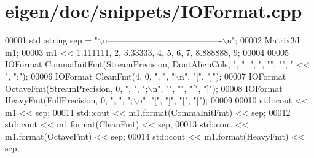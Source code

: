 \hypertarget{eigen_2doc_2snippets_2_i_o_format_8cpp_source}{}\section{eigen/doc/snippets/\+I\+O\+Format.cpp}
\label{eigen_2doc_2snippets_2_i_o_format_8cpp_source}

\begin{DoxyCode}
00001 std::string sep = \textcolor{stringliteral}{"\(\backslash\)n----------------------------------------\(\backslash\)n"};
00002 Matrix3d m1;
00003 m1 << 1.111111, 2, 3.33333, 4, 5, 6, 7, 8.888888, 9;
00004 
00005 IOFormat CommaInitFmt(StreamPrecision, DontAlignCols, \textcolor{stringliteral}{", "}, \textcolor{stringliteral}{", "}, \textcolor{stringliteral}{""}, \textcolor{stringliteral}{""}, \textcolor{stringliteral}{" << "}, \textcolor{stringliteral}{";"});
00006 IOFormat CleanFmt(4, 0, \textcolor{stringliteral}{", "}, \textcolor{stringliteral}{"\(\backslash\)n"}, \textcolor{stringliteral}{"["}, \textcolor{stringliteral}{"]"});
00007 IOFormat OctaveFmt(StreamPrecision, 0, \textcolor{stringliteral}{", "}, \textcolor{stringliteral}{";\(\backslash\)n"}, \textcolor{stringliteral}{""}, \textcolor{stringliteral}{""}, \textcolor{stringliteral}{"["}, \textcolor{stringliteral}{"]"});
00008 IOFormat HeavyFmt(FullPrecision, 0, \textcolor{stringliteral}{", "}, \textcolor{stringliteral}{";\(\backslash\)n"}, \textcolor{stringliteral}{"["}, \textcolor{stringliteral}{"]"}, \textcolor{stringliteral}{"["}, \textcolor{stringliteral}{"]"});
00009 
00010 std::cout << m1 << sep;
00011 std::cout << m1.format(CommaInitFmt) << sep;
00012 std::cout << m1.format(CleanFmt) << sep;
00013 std::cout << m1.format(OctaveFmt) << sep;
00014 std::cout << m1.format(HeavyFmt) << sep;
\end{DoxyCode}
